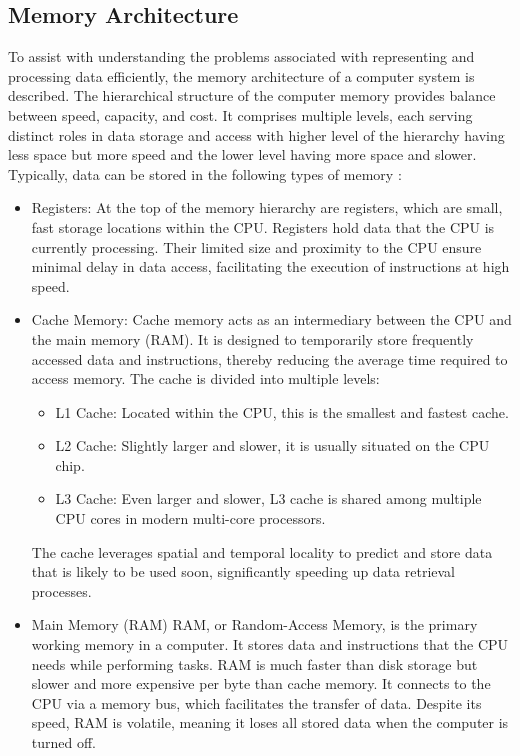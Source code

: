 \subsection{Memory Architecture} \label{memory-architecture}
To assist with understanding the problems associated with representing and processing data efficiently, the memory architecture of a computer system is described. The hierarchical structure of the computer memory provides balance between speed, capacity, and cost. It comprises multiple levels, each serving distinct roles in data storage and access with higher level of the hierarchy having less space but more speed and the lower level having more space and slower. Typically, data can be stored in the following types of memory \cite{Doran_1979}: 
\begin{itemize}
    \item Registers: At the top of the memory hierarchy are registers, which are small, fast storage locations within the CPU. Registers hold data that the CPU is currently processing. Their limited size and proximity to the CPU ensure minimal delay in data access, facilitating the execution of instructions at high speed.

    \item Cache Memory: Cache memory acts as an intermediary between the CPU and the main memory (RAM). It is designed to temporarily store frequently accessed data and instructions, thereby reducing the average time required to access memory. The cache is divided into multiple levels:

    \begin{itemize}
        \item L1 Cache: Located within the CPU, this is the smallest and fastest cache.
        \item L2 Cache: Slightly larger and slower, it is usually situated on the CPU chip.
        \item L3 Cache: Even larger and slower, L3 cache is shared among multiple CPU cores in modern multi-core processors.
    \end{itemize}
    The cache leverages spatial and temporal locality to predict and store data that is likely to be used soon, significantly speeding up data retrieval processes.

    \item Main Memory (RAM)
    RAM, or Random-Access Memory, is the primary working memory in a computer. It stores data and instructions that the CPU needs while performing tasks. RAM is much faster than disk storage but slower and more expensive per byte than cache memory. It connects to the CPU via a memory bus, which facilitates the transfer of data. Despite its speed, RAM is volatile, meaning it loses all stored data when the computer is turned off.


\end{itemize}
